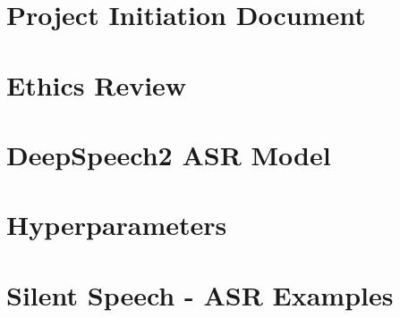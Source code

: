 \appendix


\chapter{Project Initiation Document}




\chapter{Ethics Review}



\chapter{DeepSpeech2 ASR Model}



\chapter{Hyperparameters}



\chapter{Silent Speech - ASR Examples}

